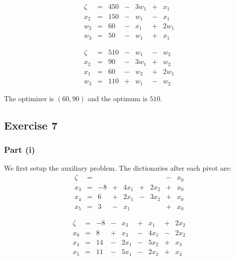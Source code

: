 \documentclass[letterpaper,12pt]{article}
\theoremstyle{definition}
\begin{document}
\begin{equation*}
\begin{matrix}
\zeta &= &450&-& 3w_1 &+& x_1 \\
\hline
x_2 &= &150&-& w_1 &-&x_1\\
w_2 &= &60 &-& x_1 &+&2w_1\\
w_3 &= &50 &- & w_1 &+& x_1
\end{matrix}
\end{equation*}

\begin{equation*}
\begin{matrix}
\zeta &= &510&-& w_1 &-& w_2 \\
\hline
x_2 &= &90&-& 3w_1 &+&w_2\\
x_1 &= &60 &-& w_2 &+&2w_1\\
w_3 &= &110 &+& w_1 &-& w_2
\end{matrix}
\end{equation*}

The optimizer is $(60,90)$ and the optimum is $510$. 

\subsection*{Exercise 7}
\subsubsection*{Part (i)}
We first setup the auxiliary problem. The dictionaries after each pivot are:
\begin{equation*}
\begin{matrix}
\zeta &= & & & & & &- & x_0 \\
\hline
x_3 &=& -8 &+& 4x_1 &+&2x_2 &+&x_0 \\
x_4 &=& 6 &+&2x_1 &-&3x_2 &+&x_0 \\
x_5 &=& 3 &-& x_1 & & &+& x_0
\end{matrix}
\end{equation*}

\begin{equation*}
\begin{matrix}
\zeta &=&-8&-&x_3&+&x_1& +& 2x_2 \\
\hline
x_0&=& 8 &+& x_3 &-&4x_1 &-&2x_2 \\
x_4 &=& 14 &-&2x_1 &-&5x_2 &+&x_3 \\
x_5 &=&11 &-& 5x_1 &-&2x_2&+& x_3
\end{matrix}
\end{equation*}
\end{document}
